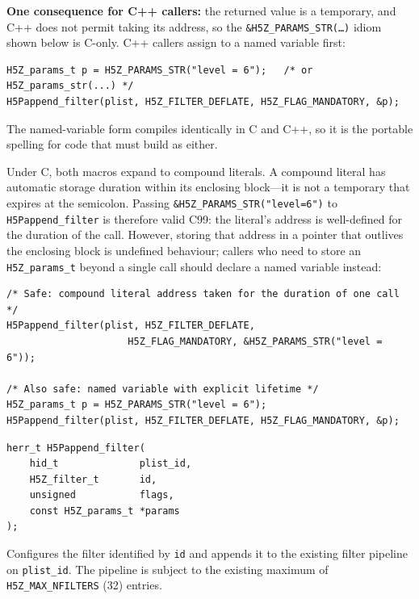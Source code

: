 \documentclass[../RFC-HDFG-2026-001.tex]{subfiles}
\begin{document}
\textbf{One consequence for C++ callers:} the returned value is a
temporary, and C++ does not permit taking its address, so the
\texttt{\&H5Z\_PARAMS\_STR(\ldots)} idiom shown below is C-only.  C++
callers assign to a named variable first:

\begin{verbatim}
H5Z_params_t p = H5Z_PARAMS_STR("level = 6");   /* or H5Z_params_str(...) */
H5Pappend_filter(plist, H5Z_FILTER_DEFLATE, H5Z_FLAG_MANDATORY, &p);
\end{verbatim}

\noindent The named-variable form compiles identically in C and C++, so it
is the portable spelling for code that must build as either.

Under C, both macros expand to compound literals.  A compound literal has
automatic storage duration within its enclosing block---it is not a
temporary that expires at the semicolon.  Passing \texttt{\&H5Z\_PARAMS\_STR("level=6")}
to \texttt{H5Pappend\_filter} is therefore valid C99: the literal's
address is well-defined for the duration of the call.  However, storing
that address in a pointer that outlives the enclosing block is undefined
behaviour; callers who need to store an \texttt{H5Z\_params\_t} beyond a
single call should declare a named variable instead:

\begin{verbatim}
/* Safe: compound literal address taken for the duration of one call */
H5Pappend_filter(plist, H5Z_FILTER_DEFLATE,
                     H5Z_FLAG_MANDATORY, &H5Z_PARAMS_STR("level = 6"));

/* Also safe: named variable with explicit lifetime */
H5Z_params_t p = H5Z_PARAMS_STR("level = 6");
H5Pappend_filter(plist, H5Z_FILTER_DEFLATE, H5Z_FLAG_MANDATORY, &p);
\end{verbatim}


\begin{verbatim}
herr_t H5Pappend_filter(
    hid_t              plist_id,
    H5Z_filter_t       id,
    unsigned           flags,
    const H5Z_params_t *params
);
\end{verbatim}

Configures the filter identified by \texttt{id} and appends it to the
existing filter pipeline on \texttt{plist\_id}.  The pipeline is subject to
the existing maximum of \texttt{H5Z\_MAX\_NFILTERS} (32) entries.
\end{document}
